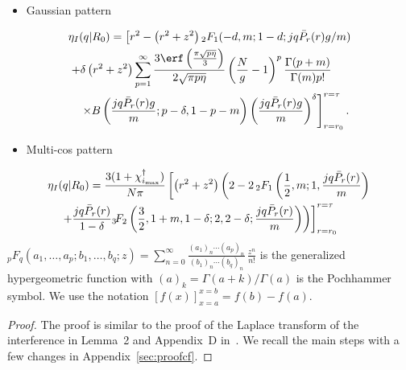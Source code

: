 \begin{proposition}
    \begin{itemize}
        \item {Gaussian pattern}
    \end{itemize} 
{\small
\begin{equation}
\begin{split}
    &\eta_I(q|R_0) = \left[r^2-\left(r^2+z^2\right) {}_2F_1(-d,m;1-d;j q \Bar{P}_r(r)g/m)\right.\\
    &\left.+\delta \left(r^2+z^2\right)\sum\limits_{p=1}^\infty  \frac{3\erf\left(\tfrac{\pi \sqrt{p \eta}}{3}\right)}{2 \sqrt{\pi p \eta}} \left(\frac{N}{g}-1\right)^p \frac{\Gamma(p+m)}{\Gamma(m)p!}\right.\\
    &\left.\quad \times B\left(\frac{j q \Bar{P}_r(r)g}{m};p-\delta,1-p-m\right)\left(\frac{j q \Bar{P}_r(r)g}{m}\right)^\delta\right]_{r = r_0}^{r=\tau}.
\end{split}
\end{equation}}
    \begin{itemize}
        \item {Multi-cos pattern}
    \end{itemize} 
{\footnotesize
\begin{equation}
\begin{split}
        &\eta_I(q|R_0) = \frac{3(1+\chi_{i_{\textrm{\normalfont max}}}^\dagger)}{N \pi} \left[\left(r^2+z^2\right)\left(2-2 \,{}_2F_1\left(\frac{1}{2}, m; 1, \frac{j q \Bar{P}_r(r)}{m}\right)\right.\right.\\
        &\quad\left.\left.+\frac{j q \Bar{P}_r(r)}{1-\delta} {}_3\!F_2\left(\frac{3}{2}, 1+m, 1-\delta;2, 2-\delta;\frac{j q \Bar{P}_r(r)}{m}\right)\right) \right]_{r = r_0}^{r=\tau}
\end{split}
\end{equation}}
${}_{p}F_{q}(a_{1},\ldots ,a_{p};b_{1},\ldots ,b_{q};z)=\sum _{n=0}^{\infty }{\frac {(a_{1})_{n}\cdots (a_{p})_{n}}{(b_{1})_{n}\cdots (b_{q})_{n}}}\,{\frac {z^{n}}{n!}}$ is the generalized hypergeometric function with $(a)_k = \Gamma(a+k)/\Gamma(a)$ is the Pochhammer symbol. We use the notation $[f(x)]_{x = a}^{x=b} = f(b)-f(a)$.
\end{proposition}
\begin{proof}
    The proof is similar to the proof of the Laplace transform of the interference in Lemma~2 and Appendix~D in~\cite{yu2017}. We recall the main steps with a few changes in Appendix~\ref{sec:proofcf}.
\end{proof}






